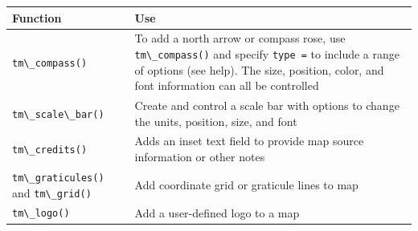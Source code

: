 \documentclass[
]{book}
\newcommand{\passthrough}[1]{#1}
\begin{document}
\begin{longtable}[]{@{}ll@{}}
\toprule
\begin{minipage}[b]{0.39\columnwidth}\raggedright
Function\strut
\end{minipage} & \begin{minipage}[b]{0.55\columnwidth}\raggedright
Use\strut
\end{minipage}\tabularnewline
\midrule
\endhead
\begin{minipage}[t]{0.39\columnwidth}\raggedright
\passthrough{\lstinline!tm\_compass()!}\strut
\end{minipage} & \begin{minipage}[t]{0.55\columnwidth}\raggedright
To add a north arrow or compass rose, use \passthrough{\lstinline!tm\_compass()!} and specify \passthrough{\lstinline!type =!} to include a range of options (see help). The size, position, color, and font information can all be controlled\strut
\end{minipage}\tabularnewline
\begin{minipage}[t]{0.39\columnwidth}\raggedright
\passthrough{\lstinline!tm\_scale\_bar()!}\strut
\end{minipage} & \begin{minipage}[t]{0.55\columnwidth}\raggedright
Create and control a scale bar with options to change the units, position, size, and font\strut
\end{minipage}\tabularnewline
\begin{minipage}[t]{0.39\columnwidth}\raggedright
\passthrough{\lstinline!tm\_credits()!}\strut
\end{minipage} & \begin{minipage}[t]{0.55\columnwidth}\raggedright
Adds an inset text field to provide map source information or other notes\strut
\end{minipage}\tabularnewline
\begin{minipage}[t]{0.39\columnwidth}\raggedright
\passthrough{\lstinline!tm\_graticules()!} and \passthrough{\lstinline!tm\_grid()!}\strut
\end{minipage} & \begin{minipage}[t]{0.55\columnwidth}\raggedright
Add coordinate grid or graticule lines to map\strut
\end{minipage}\tabularnewline
\begin{minipage}[t]{0.39\columnwidth}\raggedright
\passthrough{\lstinline!tm\_logo()!}\strut
\end{minipage} & \begin{minipage}[t]{0.55\columnwidth}\raggedright
Add a user-defined logo to a map\strut
\end{minipage}\tabularnewline
\bottomrule
\end{longtable}
\end{document}
